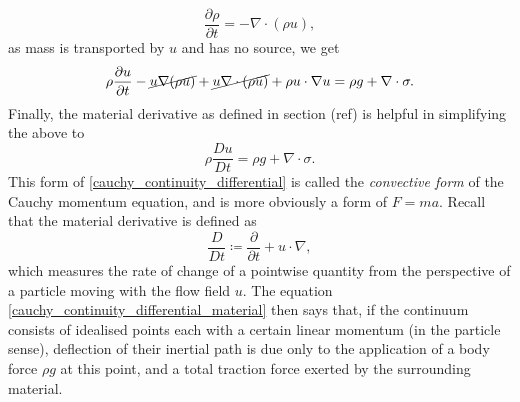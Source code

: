 \documentclass[11pt,a4paper]{memoir}
\newcommand{\omn}{{\Omega_0}}
\newcommand{\Part}[2]{\frac{\partial #1}{\partial #2}}
\begin{document}
$$\Part{\rho}{t} = -\nabla\cdot(\rho u),$$
as mass is transported by $u$ and has no source, we get
$$
    \rho\Part{u}{t} -\cancel{u\nabla(\rho u)} + \cancel{u\nabla\cdot (\rho u)} + \rho u\cdot\nabla u = \rho g + \nabla\cdot\sigma.
$$
Finally, the material derivative as defined in section (ref) is helpful in simplifying the above to
\begin{equation}\label{cauchy_continuity_differential_material}
    \rho\frac{Du}{Dt} = \rho g + \nabla\cdot\sigma.
\end{equation}
This form of \eqref{cauchy_continuity_differential} is called the \textit{convective form} of the Cauchy momentum equation, and is more obviously a form of $F = ma$.
Recall that the material derivative is defined as
    $$\frac{D}{Dt} \coloneqq \Part{}{t} + u\cdot \nabla,$$
which measures the rate of change of a pointwise quantity from the perspective of a particle moving with the flow field $u$.
The equation \eqref{cauchy_continuity_differential_material} then says that, if the continuum consists of idealised points
each with a certain linear momentum (in the particle sense), deflection of their inertial path is due only to the application
of a body force $\rho g$ at this point, and a total traction force exerted by the surrounding material.
\end{document}
